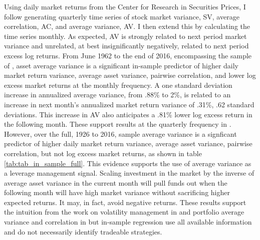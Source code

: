 Using daily market returns from the Center for Research in Securities Prices, I follow \citet{pollet_average_2010} generating quarterly time series of stock market variance, SV, average correlation, AC, and average variance, AV. I then extend this by calculating the time series monthly. As expected, AV is strongly related to next period market variance and unrelated, at best insignificantly negatively, related to next period excess log returns. 
From June 1962 to the end of 2016, encompassing the sample of  \citet{pollet_average_2010}, asset average variance is a significant in-sample predictor of higher daily market return variance, average asset variance, pairwise correlation, and lower log excess market returns at the monthly frequency. A one standard deviation increase in annualized average variance, from .88\% to 2\%, is related to an increase in next month’s annualized market return variance of .31\%, .62 standard deviations. This increase in AV also anticipates a .81\% lower log excess return in the following month. These support results at the quarterly frequency in \citet{pollet_average_2010}. However, over the full, 1926 to 2016, sample average variance is a signficant predictor of higher daily market return variance, average asset variance, pairwise correlation, but not log excess market returns, as shown in table \ref{tab:tab_in_sample_full}. This evidence supports the use of average variance as a leverage management signal. Scaling investment in the market by the inverse of average asset variance in the current month will pull funds out when the following month will have high market variance without sacrificing higher expected returns. It may, in fact, avoid negative returns. These results support the intuition from the work on volatility management in \citet{moreira_volatility-managed_2017} and portfolio average variance and correlation in \citet{pollet_average_2010}  but in-sample regression use all available information and do not necessarily identify tradeable strategies.\citep{Welch2008}

